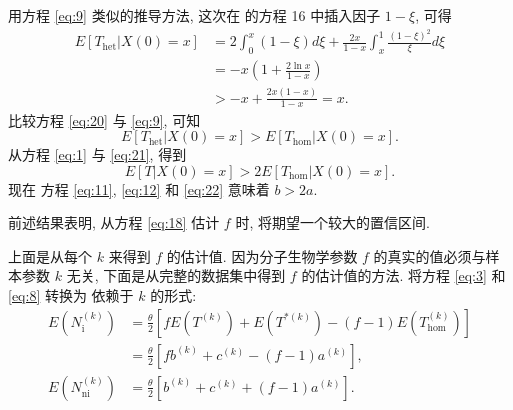 \documentclass[12pt]{article}
\begin{document}
用方程 \ref{eq:9} 类似的推导方法, 这次在 \textcite{maruyama1975} 的方程 16 中插入因子 $1 - \xi$, 可得
\begin{equation} \label{eq:20}
    \begin{split}
        E[T_\text{het} | X(0)=x]
        &= 2 \int_0^x (1-\xi) d\xi + \frac{2x}{1-x} \int_x^1 \frac{(1-\xi)^2}{\xi} d\xi \\
        &= -x \left( 1 + \frac{2 \ln{x}}{1-x} \right) \\
        &> -x + \frac{2x(1-x)}{1-x} = x
        \text{.}
    \end{split}
\end{equation}
比较方程 \ref{eq:20} 与 \ref{eq:9}, 可知
\begin{equation} \label{eq:21}
    E[T_\text{het} | X(0)=x] > E[T_\text{hom} | X(0)=x]
    \text{.}
\end{equation}
从方程 \ref{eq:1} 与 \ref{eq:21}, 得到
\begin{equation} \label{eq:22}
    E[T | X(0)=x] > 2 E[T_\text{hom} | X(0)=x]
    \text{.}
\end{equation}
现在 方程 \ref{eq:11}, \ref{eq:12} 和 \ref{eq:22} 意味着 $b > 2a$.

前述结果表明, 从方程 \ref{eq:18} 估计 $f$ 时, 将期望一个较大的置信区间.

上面是从每个 $k$ 来得到 $f$ 的估计值.
因为分子生物学参数 $f$ 的真实的值必须与样本参数 $k$ 无关, 下面是从完整的数据集中得到 $f$ 的估计值的方法.
将方程 \ref{eq:3} 和 \ref{eq:8} 转换为 依赖于 $k$ 的形式:
\begin{equation} \label{eq:23}
    \begin{split}
        E(N_\text{i}^{(k)})
        &= \frac{\theta}{2} [f E(T^{(k)}) + E(T^{*(k)}) - (f-1) E(T_{\text{hom}}^{(k)})] \\
        &= \frac{\theta}{2} [fb^{(k)} + c^{(k)} - (f-1)a^{(k)}]
        \text{,} \\
        E(N_\text{ni}^{(k)})
        &= \frac{\theta}{2} [b^{(k)} + c^{(k)} + (f-1)a^{(k)}]
        \text{.}
    \end{split}
\end{equation}
\end{document}
